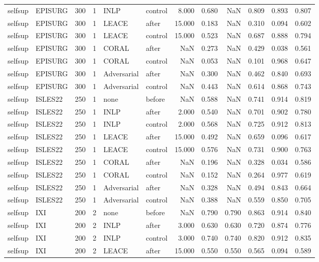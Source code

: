\begin{tabular}{llrrllrrrrrr}
selfsup & EPISURG & 300 & 1 & INLP & control & 8.000 & 0.680 & NaN & 0.809 & 0.893 & 0.807 \\
selfsup & EPISURG & 300 & 1 & LEACE & after & 15.000 & 0.183 & NaN & 0.310 & 0.094 & 0.602 \\
selfsup & EPISURG & 300 & 1 & LEACE & control & 15.000 & 0.523 & NaN & 0.687 & 0.888 & 0.794 \\
selfsup & EPISURG & 300 & 1 & CORAL & after & NaN & 0.273 & NaN & 0.429 & 0.038 & 0.561 \\
selfsup & EPISURG & 300 & 1 & CORAL & control & NaN & 0.053 & NaN & 0.101 & 0.968 & 0.647 \\
selfsup & EPISURG & 300 & 1 & Adversarial & after & NaN & 0.300 & NaN & 0.462 & 0.840 & 0.693 \\
selfsup & EPISURG & 300 & 1 & Adversarial & control & NaN & 0.443 & NaN & 0.614 & 0.868 & 0.743 \\
selfsup & ISLES22 & 250 & 1 & none & before & NaN & 0.588 & NaN & 0.741 & 0.914 & 0.819 \\
selfsup & ISLES22 & 250 & 1 & INLP & after & 2.000 & 0.540 & NaN & 0.701 & 0.902 & 0.780 \\
selfsup & ISLES22 & 250 & 1 & INLP & control & 2.000 & 0.568 & NaN & 0.725 & 0.912 & 0.813 \\
selfsup & ISLES22 & 250 & 1 & LEACE & after & 15.000 & 0.492 & NaN & 0.659 & 0.096 & 0.617 \\
selfsup & ISLES22 & 250 & 1 & LEACE & control & 15.000 & 0.576 & NaN & 0.731 & 0.900 & 0.763 \\
selfsup & ISLES22 & 250 & 1 & CORAL & after & NaN & 0.196 & NaN & 0.328 & 0.034 & 0.586 \\
selfsup & ISLES22 & 250 & 1 & CORAL & control & NaN & 0.152 & NaN & 0.264 & 0.977 & 0.619 \\
selfsup & ISLES22 & 250 & 1 & Adversarial & after & NaN & 0.328 & NaN & 0.494 & 0.843 & 0.664 \\
selfsup & ISLES22 & 250 & 1 & Adversarial & control & NaN & 0.388 & NaN & 0.559 & 0.850 & 0.705 \\
selfsup & IXI & 200 & 2 & none & before & NaN & 0.790 & 0.790 & 0.863 & 0.914 & 0.840 \\
selfsup & IXI & 200 & 2 & INLP & after & 3.000 & 0.630 & 0.630 & 0.720 & 0.874 & 0.776 \\
selfsup & IXI & 200 & 2 & INLP & control & 3.000 & 0.740 & 0.740 & 0.820 & 0.912 & 0.835 \\
selfsup & IXI & 200 & 2 & LEACE & after & 15.000 & 0.550 & 0.550 & 0.565 & 0.094 & 0.589 \\

\end{tabular}
